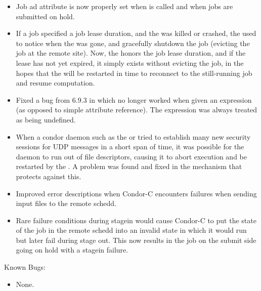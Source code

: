 \begin{itemize}
\item Job ad attribute  is now properly set when
 is called and when jobs are submitted on hold.

\item If a job specified a job lease duration, and the 
  was killed or crashed, the  used to notice when the
   was gone, and gracefully shutdown the job (evicting
  the job at the remote site).
  Now, the  honors the job lease duration, and if the
  lease has not yet expired, it simply exists without evicting the
  job, in the hopes that the  will be restarted in time
  to reconnect to the still-running job and resume computation.

\item Fixed a bug from 6.9.3 in which   no longer
worked when given an expression (as opposed to simple attribute reference).
The expression was always treated as being undefined.

\item When a condor daemon such as the  or
 tried to establish many new security sessions for
UDP messages in a short span of time, it was possible for the daemon
to run out of file descriptors, causing it to abort execution and be
restarted by the .  A problem was found and fixed in the
mechanism that protects against this.

\item Improved error descriptions when Condor-C encounters failures when
sending input files to the remote schedd.

\item Rare failure conditions during stagein would cause Condor-C to put
the state of the job in the remote schedd into an invalid state in which
it would run but later fail during stage out.  This now results in the
job on the submit side going on hold with a stagein failure.

\end{itemize}

\noindent Known Bugs:

\begin{itemize}

\item None.

\end{itemize}


